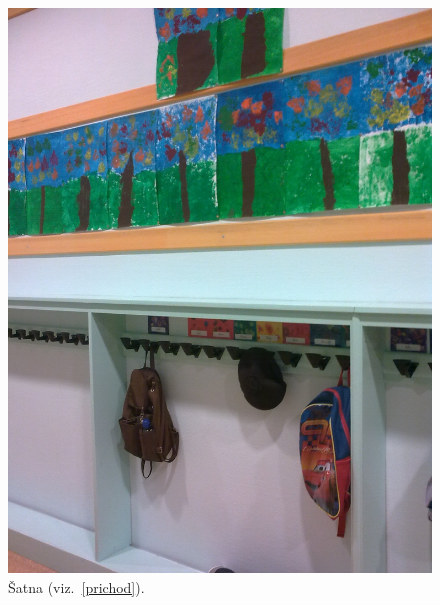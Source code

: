 	\begin{figure}[tb]
		\centering
		\includegraphics[height = 0.35\textheight]{./fotky/Obr9.jpg}
		\caption{
			Šatna (viz.~\ref{prichod}).
		}
		\label{Obr9}
	\end{figure}


